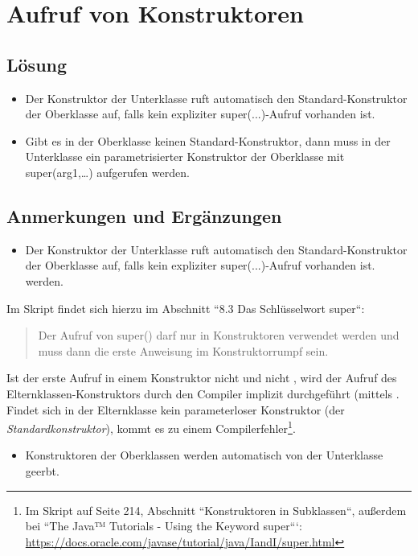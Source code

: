 \chapter{Aufruf von Konstruktoren}

\section*{Lösung}

\begin{itemize}
    \item Der Konstruktor der Unterklasse ruft automatisch den Standard-Konstruktor der Oberklasse auf, falls kein expliziter super(...)-Aufruf vorhanden ist.
    \item Gibt es in der Oberklasse keinen Standard-Konstruktor, dann muss in der Unterklasse ein parametrisierter Konstruktor der Oberklasse mit super(arg1,…) aufgerufen werden.
\end{itemize}


\section*{Anmerkungen und Ergänzungen}

\begin{itemize}
    \item Der Konstruktor der Unterklasse ruft automatisch den Standard-Konstruktor der Oberklasse auf, falls kein expliziter super(...)-Aufruf vorhanden ist.
werden.
\end{itemize}

Im Skript findet sich hierzu im Abschnitt ``8.3 Das Schlüsselwort super``:\blockquote{
Der Aufruf von super() darf nur in Konstruktoren verwendet werden und muss dann die erste Anweisung im Konstruktorrumpf sein.
}

Ist der erste Aufruf in einem Konstruktor nicht  und nicht , wird der Aufruf des Elternklassen-Konstruktors
 durch den Compiler implizit durchgeführt (mittels . Findet sich in der Elternklasse kein parameterloser Konstruktor (der \textit{Standardkonstruktor}), kommt es zu einem Compilerfehler\footnote{Im Skript auf Seite 214, Abschnitt ``Konstruktoren in Subklassen``, außerdem bei ``The Java™ Tutorials - Using the Keyword super```: \url{https://docs.oracle.com/javase/tutorial/java/IandI/super.html}}.


\begin{itemize}
\item Konstruktoren der Oberklassen werden automatisch von der Unterklasse geerbt.
\end{itemize}

